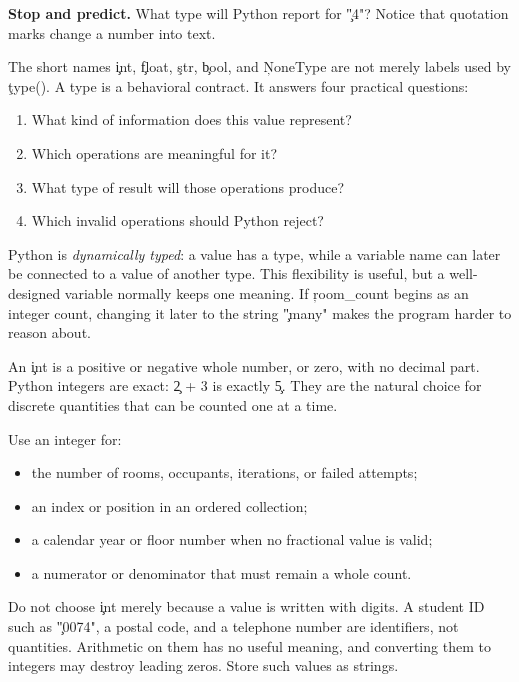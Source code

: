\begin{NoteBox}
\textbf{Stop and predict.} What type will Python report for \c{"4"}? Notice
that quotation marks change a number into text.
\end{NoteBox}


The short names \c{int}, \c{float}, \c{str}, \c{bool}, and \c{NoneType} are
not merely labels used by \c{type()}. A type is a behavioral contract. It
answers four practical questions:
\begin{enumerate}
    \item What kind of information does this value represent?
    \item Which operations are meaningful for it?
    \item What type of result will those operations produce?
    \item Which invalid operations should Python reject?
\end{enumerate}

Python is \emph{dynamically typed}: a value has a type, while a variable name
can later be connected to a value of another type. This flexibility is useful,
but a well-designed variable normally keeps one meaning. If \c{room_count}
begins as an integer count, changing it later to the string \c{"many"} makes
the program harder to reason about.


An \c{int} is a positive or negative whole number, or zero, with no decimal
part. Python integers are exact: \c{2 + 3} is exactly \c{5}. They are the
natural choice for discrete quantities that can be counted one at a time.

Use an integer for:
\begin{itemize}
    \item the number of rooms, occupants, iterations, or failed attempts;
    \item an index or position in an ordered collection;
    \item a calendar year or floor number when no fractional value is valid;
    \item a numerator or denominator that must remain a whole count.
\end{itemize}

Do not choose \c{int} merely because a value is written with digits. A student
ID such as \c{"0074"}, a postal code, and a telephone number are identifiers,
not quantities. Arithmetic on them has no useful meaning, and converting them
to integers may destroy leading zeros. Store such values as strings.

